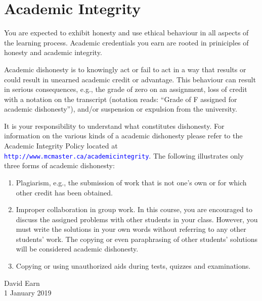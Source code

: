 \documentclass[12pt]{article}
\newcommand{\url}[1]{{\tt\textcolor{blue}{#1}}}
\begin{document}
\section*{Academic Integrity}

You are expected to exhibit honesty and use ethical behaviour in all aspects of the learning process. Academic credentials you earn are rooted in priniciples of honesty and academic integrity.

Academic dishonesty is to knowingly act or fail to act in a way that results or could result in unearned academic credit or advantage.  This behaviour can result in serious consequences, e.g., the grade of zero on an assignment, loss of credit with a notation on the transcript (notation reads: ``Grade of F assigned for academic dishonesty''), and/or suspension or expulsion from the university.

It is your responsibility to understand what constitutes dishonesty.  For information on the various kinds of a academic dishonesty please refer to the Academic Integrity Policy located at \url{http://www.mcmaster.ca/academicintegrity}.  The following illustrates only three forms of academic dishonesty:
\begin{enumerate}\addtolength{\itemsep}{-0.5\baselineskip}

\item Plagiarism, e.g., the submission of work that is not one's own or for which other credit has been obtained.

\item Improper collaboration in group work. In this course, you are encouraged to discuss the assigned problems with other students in your class. However, you must write the solutions in your own words without referring to any other students' work. The copying or even paraphrasing of other students' solutions will be considered academic dishonesty.

\item Copying or using unauthorized aids during tests, quizzes and examinations.

\end{enumerate}

\bigskip \bigskip
\noindent
David Earn\\
1 January 2019
\end{document}

